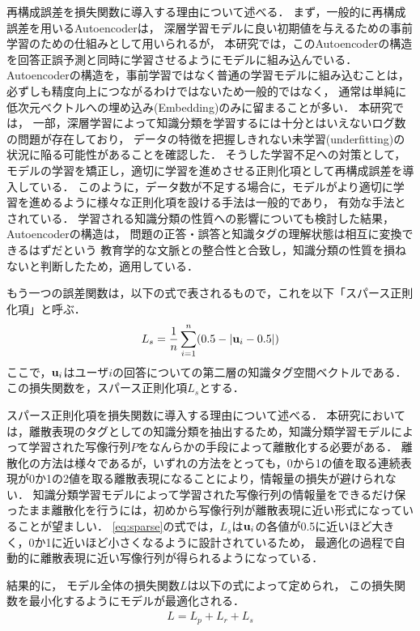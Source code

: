 再構成誤差を損失関数に導入する理由について述べる．
まず，一般的に再構成誤差を用いるAutoencoderは，
深層学習モデルに良い初期値を与えるための事前学習のための仕組みとして用いられるが，
本研究では，このAutoencoderの構造を回答正誤予測と同時に学習させるようにモデルに組み込んでいる．
Autoencoderの構造を，事前学習ではなく普通の学習モデルに組み込むことは，
必ずしも精度向上につながるわけではないため一般的ではなく，
通常は単純に低次元ベクトルへの埋め込み(Embedding)のみに留まることが多い．
本研究では，
一部，深層学習によって知識分類を学習するには十分とはいえないログ数の問題が存在しており，
データの特徴を把握しきれない未学習(underfitting)の状況に陥る可能性があることを確認した．
そうした学習不足への対策として，モデルの学習を矯正し，適切に学習を進めさせる正則化項として再構成誤差を導入している．
このように，データ数が不足する場合に，モデルがより適切に学習を進めるように様々な正則化項を設ける手法は一般的であり，
有効な手法とされている．
学習される知識分類の性質への影響についても検討した結果，
Autoencoderの構造は，
問題の正答・誤答と知識タグの理解状態は相互に変換できるはずだという
教育学的な文脈との整合性と合致し，知識分類の性質を損ねないと判断したため，適用している．


もう一つの誤差関数は，以下の式で表されるもので，これを以下「スパース正則化項」と呼ぶ．
\begin{eqnarray}
\label{eq:sparse}
L_s = {1\over n}\sum_{i=1}^n (0.5 - |{\bf u}_i - 0.5|)
\end{eqnarray}
ここで，${\bf u}_i$はユーザ$i$の回答についての第二層の知識タグ空間ベクトルである．
この損失関数を，スパース正則化項$L_s$とする．

スパース正則化項を損失関数に導入する理由について述べる．
本研究においては，離散表現のタグとしての知識分類を抽出するため，知識分類学習モデルによって学習された写像行列$P$をなんらかの手段によって離散化する必要がある．
離散化の方法は様々であるが，いずれの方法をとっても，0から1の値を取る連続表現が0か1の2値を取る離散表現になることにより，情報量の損失が避けられない．
知識分類学習モデルによって学習された写像行列の情報量をできるだけ保ったまま離散化を行うには，初めから写像行列が離散表現に近い形式になっていることが望ましい．
\ref{eq:sparse}の式では，$L_s$は${\bf u}_i$の各値が0.5に近いほど大きく，0か1に近いほど小さくなるように設計されているため，
最適化の過程で自動的に離散表現に近い写像行列が得られるようになっている．


結果的に，
モデル全体の損失関数$L$は以下の式によって定められ，
この損失関数を最小化するようにモデルが最適化される．
\begin{eqnarray}
\label{eq:total_loss}
{L = L_p + L_r + L_s}
\end{eqnarray}


